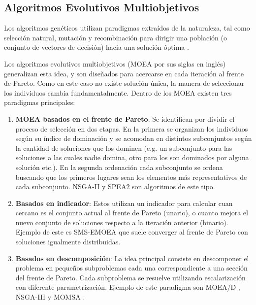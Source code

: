 \subsection{Algoritmos Evolutivos Multiobjetivos }

Los algoritmos gen\'eticos utilizan paradigmas extra\'idos de la naturaleza, tal como selecci\'on natural, mutaci\'on y recombinaci\'on para dirigir una poblaci\'on (o conjunto de vectores de decisi\'on) hacia una soluci\'on \'optima .

Los algoritmos evolutivos multiobjetivos (MOEA por sus siglas en ingl\'es) generalizan esta idea, y son diseñados para acercarse en cada iteraci\'on  al frente de Pareto. Como en este caso no existe soluci\'on \'unica, la manera de seleccionar los individuos cambia fundamentalmente. Dentro de los MOEA existen tres paradigmas principales:

\begin{enumerate}
    \item \textbf{MOEA basados en el frente de Pareto}\label{background:def:MOEA}: Se identifican por dividir el proceso de selecci\'on en dos etapas. En la primera se organizan los individuos seg\'un su \'indice de dominaci\'on y se acomodan en distintos subconjuntos seg\'un la cantidad de soluciones que los dominen (e.g. un subconjunto para las soluciones a las cuales nadie domina, otro para los son dominados por alguna soluci\'on etc.). En la segunda ordenaci\'on cada subconjunto se ordena buscando que los primeros lugares sean los elementos m\'as representativos de cada subconjunto. NSGA-II  y SPEA2  son algoritmos de este tipo.

    \item \textbf{Basados en indicador}: Estos utilizan un indicador para calcular cuan cercano es el conjunto actual al frente de Pareto (unario), o cuanto mejora el nuevo conjunto de soluciones respecto a la iteraci\'on anterior (binario). Ejemplo de este es SMS-EMOEA  que suele converger al frente de Pareto con soluciones igualmente distribuidas.

    \item \textbf{Basados en descomposici\'on}: La idea principal consiste en descomponer el problema en pequeños subproblemas cada una correspondiente a una secci\'on del frente de Pareto. Cada subproblema se resuelve utilizando escalarizaci\'on con diferente parametrizaci\'on. 
        Ejemplo de este paradigma son MOEA/D , NSGA-III  y MOMSA .

\end{enumerate}

